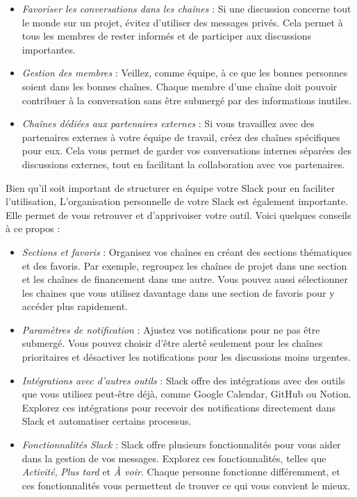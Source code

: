 \documentclass[
  letterpaper,
  DIV=11,
  numbers=noendperiod]{scrreprt}
\begin{document}
\begin{itemize}
\item
  \emph{Favoriser les conversations dans les chaînes} : Si une
  discussion concerne tout le monde sur un projet, évitez d'utiliser des
  messages privés. Cela permet à tous les membres de rester informés et
  de participer aux discussions importantes.
\item
  \emph{Gestion des membres} : Veillez, comme équipe, à ce que les
  bonnes personnes soient dans les bonnes chaînes. Chaque membre d'une
  chaîne doit pouvoir contribuer à la conversation sans être submergé
  par des informations inutiles.
\item
  \emph{Chaînes dédiées aux partenaires externes} : Si vous travaillez
  avec des partenaires externes à votre équipe de travail, créez des
  chaînes spécifiques pour eux. Cela vous permet de garder vos
  conversations internes séparées des discussions externes, tout en
  facilitant la collaboration avec vos partenaires.
\end{itemize}

Bien qu'il soit important de structurer en équipe votre Slack pour en
faciliter l'utilisation, L'organisation personnelle de votre Slack est
également importante. Elle permet de vous retrouver et d'apprivoiser
votre outil. Voici quelques conseils à ce propos :

\begin{itemize}
\item
  \emph{Sections et favoris} : Organisez vos chaînes en créant des
  sections thématiques et des favoris. Par exemple, regroupez les
  chaînes de projet dans une section et les chaînes de financement dans
  une autre. Vous pouvez aussi sélectionner les chaines que vous
  utilisez davantage dans une section de favoris pour y accéder plus
  rapidement.
\item
  \emph{Paramètres de notification} : Ajustez vos notifications pour ne
  pas être submergé. Vous pouvez choisir d'être alerté seulement pour
  les chaînes prioritaires et désactiver les notifications pour les
  discussions moins urgentes.
\item
  \emph{Intégrations avec d'autres outils} : Slack offre des
  intégrations avec des outils que vous utilisez peut-être déjà, comme
  Google Calendar, GitHub ou Notion. Explorez ces intégrations pour
  recevoir des notifications directement dans Slack et automatiser
  certains processus.
\item
  \emph{Fonctionnalités Slack} : Slack offre plusieurs fonctionnalités
  pour vous aider dans la gestion de vos messages. Explorez ces
  fonctionnalités, telles que \emph{Activité}, \emph{Plus tard} et
  \emph{À voir}. Chaque personne fonctionne différemment, et ces
  fonctionnalités vous permettent de trouver ce qui vous convient le
  mieux.
\end{itemize}
\end{document}
